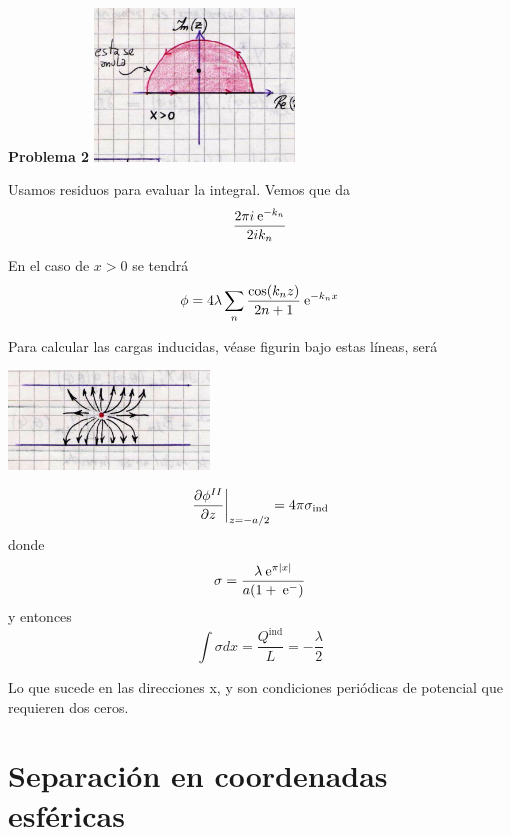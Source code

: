 \documentclass[10pt,oneside]{CBFT_book}
\begin{document}
\begin{ejemplo}{\bf Problema 2}
\includegraphics[width=0.4\textwidth]{images/fig_ft1_problema2_sep_D.jpg}

Usamos residuos para evaluar la integral. Vemos que da
\[
	\frac{2 \pi i \:\mathrm{e}^{-k_n} }{ 2 i k_n }
\]

En el caso de $x>0$ se tendrá
\[
	\phi = 4 \lambda \sum_n \frac{\cos(k_nz)}{2n +1} \:\mathrm{e}^{- k_n x}
\]

Para calcular las cargas inducidas, véase figurin bajo estas líneas, será

\includegraphics[width=0.4\textwidth]{images/fig_ft1_problema2_sep_E.jpg}

\[
	\left. \frac{\partial^{\hspace{-0.05em}} {\phi^{II}}}{\partial {z}^{\hspace{-0.05em}}} \right|_{z=-a/2} = 4 \pi \sigma_{\text{ind}}
\]
donde
\[
	\sigma = \frac{ \lambda \:\mathrm{e}^{ \pi |x|} }{a( 1 + \:\mathrm{e}^{-})} 
\]
y entonces
\[
	\int \sigma dx = \frac{Q^{\text{ind}}}{L} = - \frac{\lambda}{2}
\]

\end{ejemplo}



Lo que sucede en las direcciones x, y son condiciones periódicas de potencial que requieren
dos ceros.

\section{Separación en coordenadas esféricas}
\end{document}
